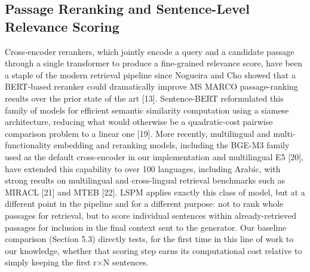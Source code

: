 \subsection{Passage Reranking and Sentence-Level Relevance Scoring}
Cross-encoder rerankers, which jointly encode a query and a candidate passage through a single transformer to produce a fine-grained relevance score, have been a staple of the modern retrieval pipeline since Nogueira and Cho showed that a BERT-based reranker could dramatically improve MS MARCO passage-ranking results over the prior state of the art [13]. Sentence-BERT reformulated this family of models for efficient semantic similarity computation using a siamese architecture, reducing what would otherwise be a quadratic-cost pairwise comparison problem to a linear one [19]. More recently, multilingual and multi-functionality embedding and reranking models, including the BGE-M3 family used as the default cross-encoder in our implementation and multilingual E5 [20], have extended this capability to over 100 languages, including Arabic, with strong results on multilingual and cross-lingual retrieval benchmarks such as MIRACL [21] and MTEB [22]. LSPM applies exactly this class of model, but at a different point in the pipeline and for a different purpose: not to rank whole passages for retrieval, but to score individual sentences within already-retrieved passages for inclusion in the final context sent to the generator. Our baseline comparison (Section 5.3) directly tests, for the first time in this line of work to our knowledge, whether that scoring step earns its computational cost relative to simply keeping the first r$\times$N sentences.

